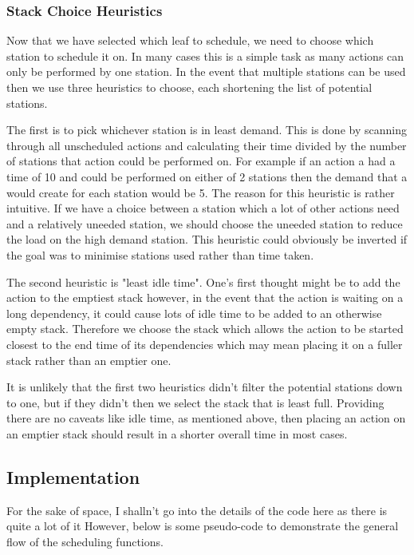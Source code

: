 \documentclass[11pt]{article}
\begin{document}
\subsubsection{Stack Choice Heuristics}

Now that we have selected which leaf to schedule, we need to choose which station to schedule it on.
In many cases this is a simple task as many actions can only be performed by one station. In the event
that multiple stations can be used then we use three heuristics to choose, each shortening the list of
potential stations.

\medbreak

The first is to pick whichever station is in least demand. This is done by scanning through all unscheduled
actions and calculating their time divided by the number of stations that action could be performed on.
For example if an action a had a time of 10 and could be performed on either of 2 stations then the demand
that a would create for each station would be 5. The reason for this heuristic is rather intuitive. If we
have a choice between a station which a lot of other actions need and a relatively uneeded station, we should
choose the uneeded station to reduce the load on the high demand station. This heuristic could obviously
be inverted if the goal was to minimise stations used rather than time taken.

\medbreak

The second heuristic is "least idle time". One's first thought might be to add the action to the emptiest
stack however, in the event that the action is waiting on a long dependency, it could cause lots of idle
time to be added to an otherwise empty stack. Therefore we choose the stack which allows the action to be
started closest to the end time of its dependencies which may mean placing it on a fuller stack rather than
an emptier one.

\medbreak

It is unlikely that the first two heuristics didn't filter the potential stations down to one, but if they
didn't then we select the stack that is least full. Providing there are no caveats like idle time, as mentioned
above, then placing an action on an emptier stack should result in a shorter overall time in most cases.

\subsection{Implementation}

For the sake of space, I shalln't go into the details of the code here as there is quite a lot of it
However, below is some pseudo-code to demonstrate the general flow of the scheduling functions.
\end{document}
